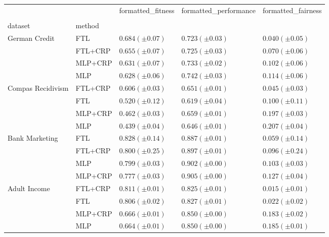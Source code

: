 \begin{tabular}{lllll}
\toprule
 &  & formatted_fitness & formatted_performance & formatted_fairness \\
 &  &  &  &  \\
dataset & method &  &  &  \\
\midrule
\multirow[t]{4}{*}{German Credit} & FTL & $0.684 (\pm0.07)$ & $0.723 (\pm0.03)$ & $0.040 (\pm0.05)$ \\
 & FTL+CRP & $0.655 (\pm0.07)$ & $0.725 (\pm0.03)$ & $0.070 (\pm0.06)$ \\
 & MLP+CRP & $0.631 (\pm0.07)$ & $0.733 (\pm0.02)$ & $0.102 (\pm0.06)$ \\
 & MLP & $0.628 (\pm0.06)$ & $0.742 (\pm0.03)$ & $0.114 (\pm0.06)$ \\
\cline{1-5}
\multirow[t]{4}{*}{Compas Recidivism} & FTL+CRP & $0.606 (\pm0.03)$ & $0.651 (\pm0.01)$ & $0.045 (\pm0.03)$ \\
 & FTL & $0.520 (\pm0.12)$ & $0.619 (\pm0.04)$ & $0.100 (\pm0.11)$ \\
 & MLP+CRP & $0.462 (\pm0.03)$ & $0.659 (\pm0.01)$ & $0.197 (\pm0.03)$ \\
 & MLP & $0.439 (\pm0.04)$ & $0.646 (\pm0.01)$ & $0.207 (\pm0.04)$ \\
\cline{1-5}
\multirow[t]{4}{*}{Bank Marketing} & FTL & $0.828 (\pm0.14)$ & $0.887 (\pm0.01)$ & $0.059 (\pm0.14)$ \\
 & FTL+CRP & $0.800 (\pm0.25)$ & $0.897 (\pm0.01)$ & $0.096 (\pm0.24)$ \\
 & MLP & $0.799 (\pm0.03)$ & $0.902 (\pm0.00)$ & $0.103 (\pm0.03)$ \\
 & MLP+CRP & $0.777 (\pm0.03)$ & $0.905 (\pm0.00)$ & $0.127 (\pm0.04)$ \\
\cline{1-5}
\multirow[t]{4}{*}{Adult Income} & FTL+CRP & $0.811 (\pm0.01)$ & $0.825 (\pm0.01)$ & $0.015 (\pm0.01)$ \\
 & FTL & $0.806 (\pm0.02)$ & $0.827 (\pm0.01)$ & $0.022 (\pm0.02)$ \\
 & MLP+CRP & $0.666 (\pm0.01)$ & $0.850 (\pm0.00)$ & $0.183 (\pm0.02)$ \\
 & MLP & $0.664 (\pm0.01)$ & $0.850 (\pm0.00)$ & $0.185 (\pm0.01)$ \\
\cline{1-5}
\bottomrule
\end{tabular}
